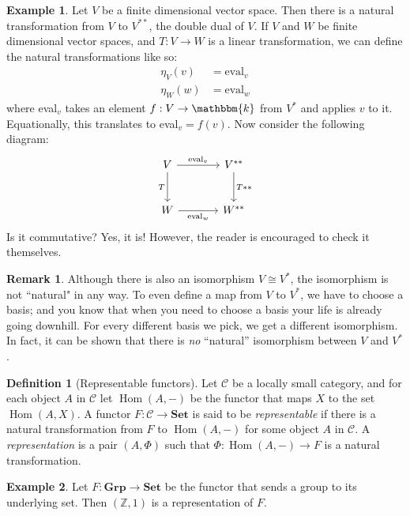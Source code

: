 \documentclass[12pt]{book}
\theoremstyle{definition}
\newtheorem{definition}{Definition}[section]
\newtheorem{defexample}{Example}[definition]
\theoremstyle{plain}
\theoremstyle{definition}
\newtheorem*{remark}{Remark}
\newcommand{\Z}{\mathbb{Z}}
\DeclareMathOperator{\Hom}{Hom}
\begin{document}
\begin{defexample}
  Let $V$ be a finite dimensional vector space. Then there is a natural transformation from $V$ to $V^{**}$, the double dual of $V$. If $V$ and $W$ be finite dimensional vector spaces, and $T: V \rightarrow W$ is a linear transformation, we can define the natural transformations like so: 
  \begin{align*}
    \eta_V(v) &= \text{eval}_v \\
    \eta_W(w) &= \text{eval}_w
  \end{align*}
  where eval$_v$ takes an element $f: V \rightarrow \mathbbm{k}$ from $V^*$ and applies $v$ to it. Equationally, this translates to eval$_v = f(v)$. Now consider the following diagram:
  \[\begin{tikzcd}[row sep=large, column sep = large]
    V \arrow{r}{\text{eval}_v} \arrow[swap]{d}{T} & V^{**} \arrow{d}{T**} \\
    W \arrow[swap]{r}{\text{eval}_w} & W^{**}
  \end{tikzcd}\]
  Is it commutative? Yes, it is! However, the reader is encouraged to check it themselves.
\end{defexample}

\begin{remark}
Although there is also an isomorphism $V \cong V^*$, the isomorphism is not ``natural" in any way. To even define a map from $V$ to $V^*$, we have to choose a basis; and you know that when you need to choose a basis your life is already going downhill. For every different basis we pick, we get a different isomorphism. In fact, it can be shown that there is \emph{no} ``natural'' isomorphism between $V$ and $V^*$.
\end{remark}

\begin{definition}[Representable functors]
  Let $\mathscr{C}$ be a locally small category, and for each object $A$ in $\mathscr{C}$ let $\Hom(A, -)$ be the functor that maps $X$ to the set $\Hom(A, X)$. A functor $F : \mathscr{C} \rightarrow \mathbf{Set}$ is said to be \emph{representable} if there is a natural transformation from $F$ to $\Hom(A, -)$ for some object $A$ in $\mathscr{C}$. A \emph{representation} is a pair $(A, \Phi)$ such that $\Phi : \Hom(A, -) \rightarrow F$ is a natural transformation.
\end{definition}

\begin{defexample}
  Let $F : \mathbf{Grp} \rightarrow \mathbf{Set}$ be the functor that sends a group to its underlying set. Then $(\Z, 1)$ is a representation of $F$.
\end{defexample}
\end{document}
